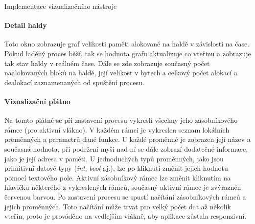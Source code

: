 \documentclass[czech,bachelor,male,python,dept460,hidelinks]{diploma}						%
\begin{document}
\begin{section}{Implementace vizualizačního nástroje}
	\paragraph*{Detail haldy}
		Toto okno zobrazuje graf velikosti paměti alokované na haldě v závislosti na čase. Pokud laděný proces běží, tak se hodnota grafu aktualizuje co vteřinu
		a zobrazuje tak stav haldy v reálném čase. Dále se zde zobrazuje současný počet naalokovaných bloků na haldě, její velikost v bytech a celkový počet
		alokací a dealokací zaznamenaných od spuštění procesu.
	\paragraph*{Vizualizační plátno} Na tomto plátně se při zastavení procesu vykreslí všechny jeho zásobníkového rámce (pro aktivní vlákno). V každém rámci je
		vykreslen seznam lokálních proměnných a parametrů dané funkce. U každé proměnné je zobrazen její název a současná hodnota, při podržení myši nad ní se dále
		zobrazí dodatečné informace, jako je její adresa v paměti. U jednoduchých typů proměnných, jako jsou primitivní datové typy (\textit{int}, \textit{bool}
		aj.), lze po kliknutí změnit jejich hodnotu pomocí textového pole. Aktivní zásobníkový rámec lze změnit kliknutím na hlavičku některého z vykreslených
		rámců, současný aktivní rámec je zvýrazněn červenou barvou. Po zastavení procesu se spustí načítání zásobníkových
		rámců a jejich proměnných. Toto načítání může trvat pro velký počet dat až několik vteřin, proto je prováděno na vedlejším vlákně, aby aplikace
		zůstala responzivní.

\end{section}
\end{document}

